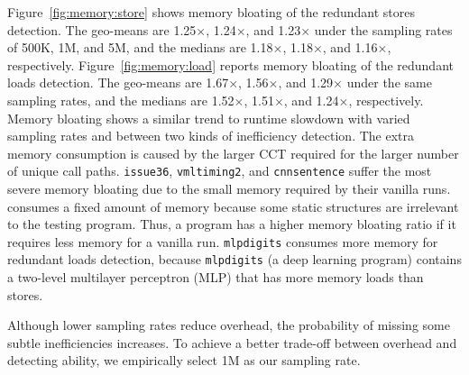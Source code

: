



Figure~\ref{fig:memory:store} shows memory bloating of the redundant stores detection. The geo-means are 1.25$\times$, 1.24$\times$, and 1.23$\times$ under the sampling rates of 500K, 1M, and 5M, and the medians are 1.18$\times$, 1.18$\times$, and 1.16$\times$, respectively. Figure~\ref{fig:memory:load} reports memory bloating of the redundant loads detection. The geo-means are 1.67$\times$, 1.56$\times$, and 1.29$\times$ under the same sampling rates, and the medians are 1.52$\times$, 1.51$\times$, and 1.24$\times$, respectively. Memory bloating shows a similar trend to runtime slowdown with varied sampling rates and between two kinds of inefficiency detection. The extra memory consumption is caused by the larger CCT required for the larger number of unique call paths. {\tt issue36}, {\tt vmltiming2}, and {\tt cnnsentence} suffer the most severe memory bloating due to the small memory required by their vanilla 
runs.  \tool consumes a fixed amount of memory because some static structures are irrelevant to the testing program. Thus, a program has a higher memory bloating ratio if it requires less memory for a vanilla run. {\tt mlpdigits} consumes more memory for redundant loads detection, because {\tt mlpdigits} (a deep learning program) contains a two-level multilayer perceptron (MLP) that has more memory loads than stores. %

Although lower sampling rates reduce overhead, the probability of missing some subtle inefficiencies increases. To achieve a better trade-off between overhead and detecting ability, we empirically select 1M as our sampling rate.







        

